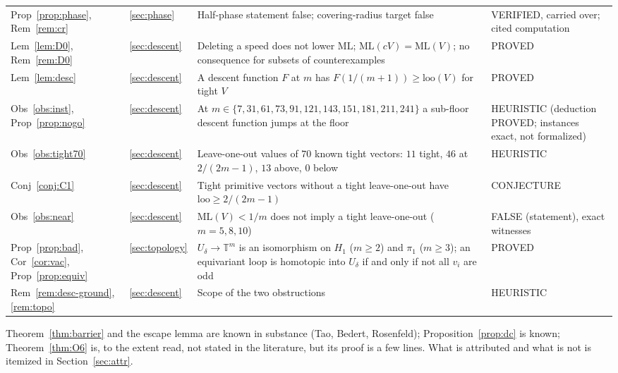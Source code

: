 \documentclass[11pt]{article}
\theoremstyle{remark}
\newcommand{\ML}{\mathrm{ML}}
\newcommand{\loo}{\mathrm{loo}}
\begin{document}
\begin{center}
\begin{tabular}{@{}llp{7.0cm}p{2.2cm}@{}}
Prop~\ref{prop:phase}, Rem~\ref{rem:cr} & \ref{sec:phase} & Half-phase statement false; covering-radius target false & VERIFIED, carried over; cited computation\\
Lem~\ref{lem:D0}, Rem~\ref{rem:D0} & \ref{sec:descent} & Deleting a speed does not lower $\ML$; $\ML(cV)=\ML(V)$; no consequence for subsets of counterexamples & PROVED\\
Lem~\ref{lem:desc} & \ref{sec:descent} & A descent function $F$ at $m$ has $F(1/(m+1))\ge\loo(V)$ for tight $V$ & PROVED\\
Obs~\ref{obs:inst}, Prop~\ref{prop:nogo} & \ref{sec:descent} & At $m\in\{7,31,61,73,91,121,143,151,181,211,241\}$ a sub-floor descent function jumps at the floor & HEURISTIC (deduction PROVED; instances exact, not formalized)\\
Obs~\ref{obs:tight70} & \ref{sec:descent} & Leave-one-out values of $70$ known tight vectors: $11$ tight, $46$ at $2/(2m-1)$, $13$ above, $0$ below & HEURISTIC\\
Conj~\ref{conj:C1} & \ref{sec:descent} & Tight primitive vectors without a tight leave-one-out have $\loo\ge2/(2m-1)$ & CONJECTURE\\
Obs~\ref{obs:near} & \ref{sec:descent} & $\ML(V)<1/m$ does not imply a tight leave-one-out ($m=5,8,10$) & FALSE (statement), exact witnesses\\
Prop~\ref{prop:bad}, Cor~\ref{cor:vac}, Prop~\ref{prop:equiv} & \ref{sec:topology} & $U_\delta\to\mathbb T^m$ is an isomorphism on $H_1$ ($m\ge2$) and $\pi_1$ ($m\ge3$); an equivariant loop is homotopic into $U_\delta$ if and only if not all $v_i$ are odd & PROVED\\
Rem~\ref{rem:desc-ground}, \ref{rem:topo} & \ref{sec:descent} & Scope of the two obstructions & HEURISTIC\\
\bottomrule
\end{tabular}
\end{center}
Theorem~\ref{thm:barrier} and the escape lemma are known in substance (Tao, Bedert, Rosenfeld); Proposition~\ref{prop:dc} is known; Theorem~\ref{thm:O6} is, to the extent read, not stated in the literature, but its proof is a few lines. What is attributed and what is not is itemized in Section~\ref{sec:attr}.
\end{document}
